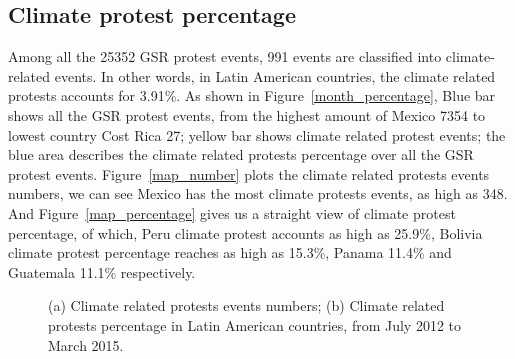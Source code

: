 \documentclass[9pt,twocolumn,twoside]{pnas-new}
\begin{document}

\subsection{Climate protest percentage}
Among all the 25352 GSR protest events,  991 events are classified into climate-related events. In other words, in Latin American countries, the climate related protests accounts for 3.91\%. As shown in Figure~\ref{month_percentage}, Blue bar shows all the GSR protest events, from the highest amount of Mexico 7354 to lowest country Cost Rica 27; yellow bar shows climate related protest events; the blue area describes the climate related protests percentage over all the GSR protest events. Figure~\ref{map_number} plots the climate related protests events numbers, we can see Mexico has the most climate protests events, as high as 348. And Figure~\ref{map_percentage} gives us a straight view of climate protest percentage, of which, Peru climate protest accounts as high as 25.9\%, Bolivia climate protest percentage reaches as high as 15.3\%, Panama 11.4\% and Guatemala 11.1\% respectively.

\begin{figure}[ht]
	\centering
	\caption{(a) Climate related protests events numbers; (b) Climate related protests percentage in Latin American countries, from July 2012 to March 2015. }
\label{map}
\end{figure}
\end{document}
